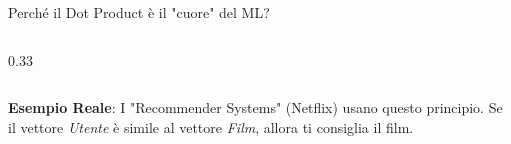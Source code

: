\documentclass[aspectratio=169, 10pt]{beamer}
\begin{document}
\begin{frame}{Perché il Dot Product è il "cuore" del ML?}
\begin{columns}[T]
        \begin{column}{0.33\textwidth}
            \centering
        \end{column}
    \end{columns}
    
    \vspace{1em}
    \textbf{Esempio Reale}: I "Recommender Systems" (Netflix) usano questo principio. Se il vettore \textit{Utente} è simile al vettore \textit{Film}, allora ti consiglia il film.
\end{frame}
\end{document}
